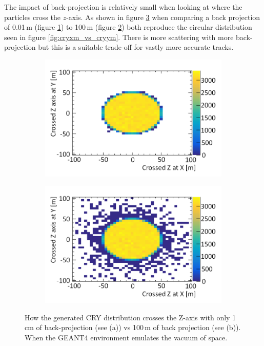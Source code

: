 The impact of back-projection is relatively small when looking at where the particles cross the $z$-axis. As shown in figure \ref{fig:Crossed_atZ_XY_AndShort} when comparing a back projection of 0.01\,m (figure \ref{subFig:CrossedZAxisShort}) to 100\,m (figure \ref{subFig:Crossed_atZ_XY}) both reproduce the circular distribution seen in figure \ref{fig:cryxm_vs_cryym}. There is more scattering with more back-projection but this is a suitable trade-off for vastly more accurate tracks. 

\begin{figure}[!h]
\centering
\begin{subfigure}{.5\textwidth}
  \centering
  \includegraphics[width=\linewidth]{Chapter4/Figs/Raster/CryPlots/CrossedZAxisShortMedText.png}
  \captionsetup{width=.9\linewidth}
  \caption{}
  \label{subFig:CrossedZAxisShort}
\end{subfigure}%
\begin{subfigure}{.5\textwidth}
  \centering
  \includegraphics[width=\linewidth]{Chapter4/Figs/Raster/CryPlots/Crossed_atZ_XYMedText.png}
  \captionsetup{width=.9\linewidth}
  \caption{}
  \label{subFig:Crossed_atZ_XY}
\end{subfigure}
\caption[How the generated CRY distribution crosses the Z-axis.]{How the generated CRY distribution crosses the Z-axis with only 1\,cm of back-projection (see (a)) vs 100\,m of back projection (see (b)). When the GEANT4 environment emulates the vacuum of space.}
\label{fig:Crossed_atZ_XY_AndShort}
\end{figure}

